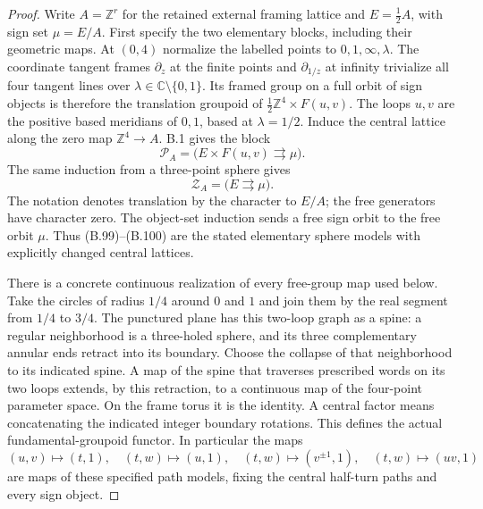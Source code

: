 \begin{proof}
Write $A=\mathbb Z^r$ for the retained external framing lattice
and $E=\tfrac12 A$, with sign set $\mu=E/A$.  First specify the
two elementary blocks, including their geometric maps.  At
$(0,4)$ normalize the labelled points to $0,1,\infty,\lambda$.
The coordinate tangent frames $\partial_z$ at the finite
points and $\partial_{1/z}$ at infinity trivialize all four
tangent lines over $\lambda\in\mathbb C\setminus\{0,1\}$.
Its framed group on a full orbit of sign objects is therefore
the translation groupoid of
$\tfrac12\mathbb Z^4\times F(u,v)$.  The loops $u,v$ are the
positive based meridians of $0,1$, based at $\lambda=1/2$.
Induce the central lattice along the zero map
$\mathbb Z^4\to A$.  B.1 gives the block
\[
 \mathcal P_A=\bigl(E\times F(u,v)\rightrightarrows\mu\bigr).
                                                               \tag{B.99}
\]
The same induction from a three-point sphere gives
\[
 \mathcal Z_A=\bigl(E\rightrightarrows\mu\bigr).                \tag{B.100}
\]
The notation denotes translation by the character to $E/A$;
the free generators have character zero.  The object-set
induction sends a free sign orbit to the free orbit $\mu$.
Thus (B.99)--(B.100) are the stated elementary sphere models
with explicitly changed central lattices.

There is a concrete continuous realization of every free-group
map used below.  Take the circles of radius $1/4$ around $0$
and $1$ and join them by the real segment from $1/4$ to $3/4$.
The punctured plane has this two-loop graph as a spine: a
regular neighborhood is a three-holed sphere, and its three
complementary annular ends retract into its boundary.  Choose
the collapse of that neighborhood to its indicated spine.
A map of the spine that traverses prescribed words on its two
loops extends, by this retraction, to a continuous map of the
four-point parameter space.  On the frame torus it is the
identity.  A central factor means concatenating the indicated
integer boundary rotations.  This defines the actual
fundamental-groupoid functor.  In particular the maps
\[
 (u,v)\mapsto(t,1),\quad (t,w)\mapsto(u,1),\quad
 (t,w)\mapsto(v^{\pm1},1),\quad
 (t,w)\mapsto(uv,1)                                           \tag{B.101}
\]
are maps of these specified path models, fixing the central
half-turn paths and every sign object.


\end{proof}
